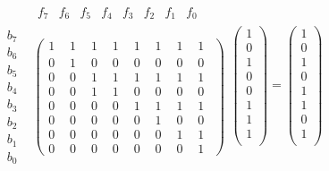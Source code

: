 \documentclass[12pt,a4paper]{article} %
\numberwithin{equation}{section} %
\numberwithin{figure}{section} %
\numberwithin{table}{section} %
\begin{document}
$$
\begin{matrix}
& \begin{matrix}f_7 & f_6 & f_5 & f_4 & f_3 & f_2 & f_1 & f_0 \end{matrix} \\
\begin{matrix}b_7\\b_6\\b_5\\b_4\\b_3\\b_2\\b_1\\b_0\end{matrix}&
\begin{pmatrix} 1_{\phantom{7}} & 1_{\phantom{6}} & 1_{\phantom{5}} & 1_{\phantom{4}} & 1_{\phantom{3}} & 1_{\phantom{2}} & 1_{\phantom{1}} & 1_{\phantom{0}} \\
               0 & 1 & 0 & 0 & 0 & 0 & 0 & 0 \\
               0 & 0 & 1 & 1 & 1 & 1 & 1 & 1 \\
               0 & 0 & 1 & 1 & 0 & 0 & 0 & 0  \\
               0 & 0 & 0 & 0 & 1 & 1 & 1 & 1 \\
               0 & 0 & 0 & 0 & 0 & 1 & 0 & 0 \\
               0 & 0 & 0 & 0 & 0 & 0 & 1 & 1  \\
               0 & 0 & 0 & 0 & 0 & 0 & 0 & 1 
 \end{pmatrix}
\end{matrix}
\begin{pmatrix}
  1 \\
  0 \\
  1 \\
  0 \\
  0 \\
  1 \\
  1 \\
  1\\
 \end{pmatrix}
 =
 \begin{pmatrix}
  1 \\
  0 \\
  1 \\
  0 \\
  1 \\
  1 \\
  0 \\
  1\\
 \end{pmatrix}
$$
\end{document}
